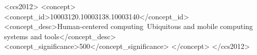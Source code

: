 \documentclass[sigconf]{acmart}
\begin{document}
\begin{CCSXML}
<ccs2012>
   <concept>
       <concept_id>10003120.10003138.10003140</concept_id>
       <concept_desc>Human-centered computing~Ubiquitous and mobile computing systems and tools</concept_desc>
       <concept_significance>500</concept_significance>
       </concept>
 </ccs2012>
\end{CCSXML}




\maketitle

\end{document}
